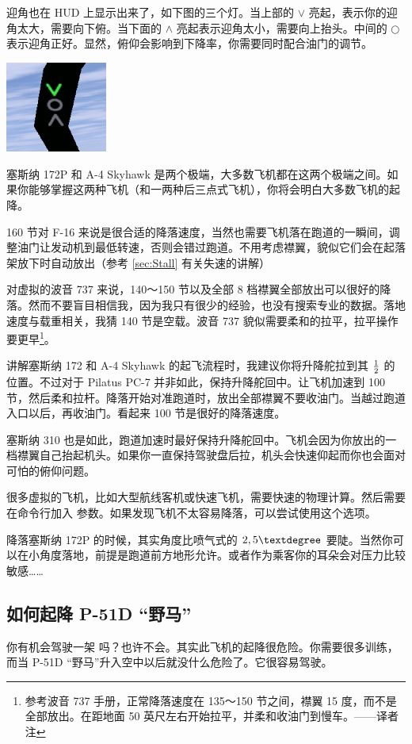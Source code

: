 迎角也在 HUD 上显示出来了，如下图的三个灯。当上部的 $\vee$ 亮起，表示你的迎角太大，需要向下俯。当下面的  $\wedge$ 亮起表示迎角太小，需要向上抬头。中间的 $\bigcirc$ 表示迎角正好。显然，俯仰会影响到下降率，你需要同时配合油门的调节。

\begin{center}
\includegraphics[width=0.25\textwidth]{img/tut_57}
\end{center}

塞斯纳 172P 和 A-4 Skyhawk 是两个极端，大多数飞机都在这两个极端之间。如果你能够掌握这两种飞机（和一两种后三点式飞机），你将会明白大多数飞机的起降。

160 节对 F-16 来说是很合适的降落速度，当然也需要飞机落在跑道的一瞬间，调整油门让发动机到最低转速，否则会错过跑道。不用考虑襟翼，貌似它们会在起落架放下时自动放出（参考 \ref{sec:Stall} 有关失速的讲解）

对虚拟的波音 737 来说，140～150 节以及全部 8 档襟翼全部放出可以很好的降落。然而不要盲目相信我，因为我只有很少的经验，也没有搜索专业的数据。落地速度与载重相关，我猜 140 节是空载。波音 737 貌似需要柔和的拉平，拉平操作要更早\footnote{参考波音 737 手册，正常降落速度在 135～150 节之间，襟翼 15 度，而不是全部放出。在距地面 50 英尺左右开始拉平，并柔和收油门到慢车。——译者注}。

讲解塞斯纳 172 和 A-4 Skyhawk 的起飞流程时，我建议你将升降舵拉到其 $1\over2$ 的位置。不过对于 Pilatus PC-7 并非如此，保持升降舵回中。让飞机加速到 100 节，然后柔和拉杆。降落开始对准跑道时，放出全部襟翼不要收油门。当越过跑道入口以后，再收油门。看起来 100 节是很好的降落速度。

塞斯纳 310 也是如此，跑道加速时最好保持升降舵回中。飞机会因为你放出的一档襟翼自己抬起机头。如果你一直保持驾驶盘后拉，机头会快速仰起而你也会面对可怕的俯仰问题。

很多虚拟的飞机，比如大型航线客机或快速飞机，需要快速的物理计算。然后需要在命令行加入  参数。如果发现飞机不太容易降落，可以尝试使用这个选项。

降落塞斯纳 172P 的时候，其实角度比喷气式的 $2,5\textdegree$ 要陡。当然你可以在小角度落地，前提是跑道前方地形允许。或者作为乘客你的耳朵会对压力比较敏感……

\subsection{如何起降 P-51D “野马”}
\label{sec:P-51D}
你有机会驾驶一架 吗？也许不会。其实此飞机的起降很危险。你需要很多训练，而当 P-51D “野马”升入空中以后就没什么危险了。它很容易驾驶。

